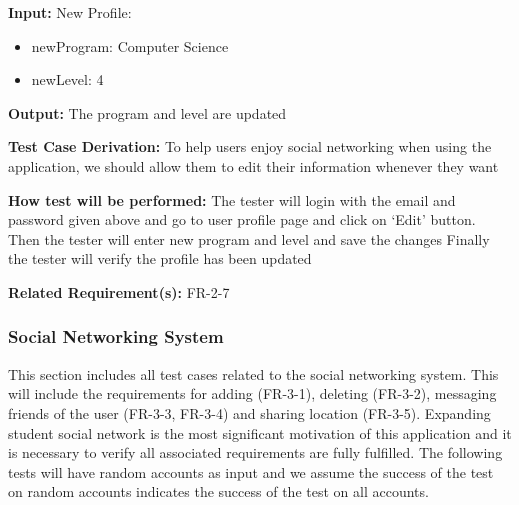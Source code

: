 \documentclass[12pt, titlepage]{article}
\begin{document}
\begin{enumerate}
\textbf{Input:} New Profile:
\begin{itemize}
\item newProgram: Computer Science
\item newLevel: 4
\end{itemize}
					
\textbf{Output:} The program and level are updated

\textbf{Test Case Derivation:} To help users enjoy social networking when using the application, we should allow them to edit their information whenever they want
					
\textbf{How test will be performed:} The tester will login with the email and password given above and go to user profile page and click on `Edit' button. Then the tester will enter new program and level and save the changes Finally the tester will verify the profile has been updated

\textbf{Related Requirement(s):} FR-2-7
\end{enumerate}

\subsubsection{Social Networking System}

This section includes all test cases related to the social networking system. This will include the requirements for adding (FR-3-1), deleting (FR-3-2), messaging friends of the user (FR-3-3, FR-3-4) and sharing location (FR-3-5). Expanding student social network is the most significant motivation of this application and it is necessary to verify all associated requirements are fully fulfilled. The following tests will have random accounts as input and we assume the success of the test on random accounts indicates the success of the test on all accounts.
\end{document}

